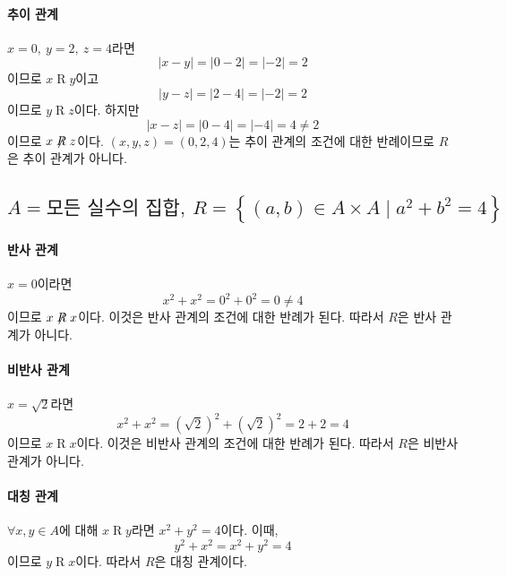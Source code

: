 \documentclass{oblivoir}
\begin{document}
\paragraph{추이 관계}
$x = 0,\ y = 2,\ z = 4$라면
\begin{equation}
    |x - y| = |0 - 2| = |-2| = 2
\end{equation}
이므로 $x \mathrel R y$이고
\begin{equation}
    |y - z| = |2 - 4| = |-2| = 2
\end{equation}
이므로 $y \mathrel R z$이다.
하지만
\begin{equation}
    |x - z| = |0 - 4| = |-4| = 4 \neq 2
\end{equation}
이므로 $x \not \mathrel R z$이다.
$(x,y,z) = (0,2,4)$는 추이 관계의 조건에 대한 반례이므로
$R$은 추이 관계가 아니다.

\subsection{$A = \textrm{모든 실수의 집합},\ R = \left\{ (a,b) \in A \times A \mid a^2 + b^2 = 4 \right\}$}

\paragraph{반사 관계}
$x = 0$이라면
\begin{equation}
    x^2 + x^2 = 0^2 + 0^2 = 0 \neq 4
\end{equation}
이므로 $x \not \mathrel R x$이다.
이것은 반사 관계의 조건에 대한 반례가 된다.
따라서 $R$은 반사 관계가 아니다.

\paragraph{비반사 관계}
$x = \sqrt 2$라면
\begin{equation}\label{eq:xsqrt2}
    x^2 + x^2 = \left(\sqrt 2\right)^2 + \left(\sqrt 2\right)^2 = 2 + 2 = 4
\end{equation}
이므로 $x \mathrel R x$이다.
이것은 비반사 관계의 조건에 대한 반례가 된다.
따라서 $R$은 비반사 관계가 아니다.

\paragraph{대칭 관계}
$\forall x, y \in A$에 대해 $x \mathrel R y$라면
$x^2 + y^2 = 4$이다.
이때,
\begin{equation}
    y^2 + x^2 = x^2 + y^2 = 4
\end{equation}
이므로 $y \mathrel R x$이다.
따라서 $R$은 대칭 관계이다.
\end{document}
